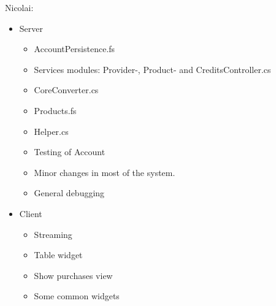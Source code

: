 Nicolai: 
\begin{itemize}
	\item Server
	\begin{itemize}
		\item AccountPersistence.fs
		\item Services modules: Provider-, Product- and CreditsController.cs
		\item CoreConverter.cs
		\item Products.fs
		\item Helper.cs
		\item Testing of Account
		\item Minor changes in most of the system.
		\item General debugging
	\end{itemize}
	\item Client
	\begin{itemize}
		\item Streaming
		\item Table widget
		\item Show purchases view
		\item Some common widgets
	\end{itemize}
\end{itemize}